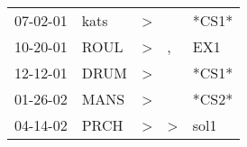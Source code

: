 \begin{supertabular}{p{0.07\textwidth}p{0.06\textwidth}p{0.02\textwidth}p{0.02\textwidth}p{0.06\textwidth}}
 07-02-01\textsuperscript{} &           kats\textsuperscript{} &  \textgreater &               &                   *CS1* \\
 10-20-01\textsuperscript{} &           ROUL\textsuperscript{} &  \textgreater &             , &   EX1\textsuperscript{} \\
 12-12-01\textsuperscript{} &           DRUM\textsuperscript{} &  \textgreater &               &                   *CS1* \\
 01-26-02\textsuperscript{} &           MANS\textsuperscript{} &  \textgreater &               &                   *CS2* \\
 04-14-02\textsuperscript{} &           PRCH\textsuperscript{} &  \textgreater &  \textgreater &  sol1\textsuperscript{} \\
\end{supertabular}
